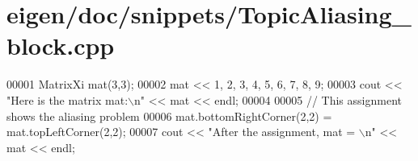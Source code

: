 \hypertarget{eigen_2doc_2snippets_2_topic_aliasing__block_8cpp_source}{}\section{eigen/doc/snippets/\+Topic\+Aliasing\+\_\+block.cpp}
\label{eigen_2doc_2snippets_2_topic_aliasing__block_8cpp_source}

\begin{DoxyCode}
00001 MatrixXi mat(3,3); 
00002 mat << 1, 2, 3,   4, 5, 6,   7, 8, 9;
00003 cout << \textcolor{stringliteral}{"Here is the matrix mat:\(\backslash\)n"} << mat << endl;
00004 
00005 \textcolor{comment}{// This assignment shows the aliasing problem}
00006 mat.bottomRightCorner(2,2) = mat.topLeftCorner(2,2);
00007 cout << \textcolor{stringliteral}{"After the assignment, mat = \(\backslash\)n"} << mat << endl;
\end{DoxyCode}
